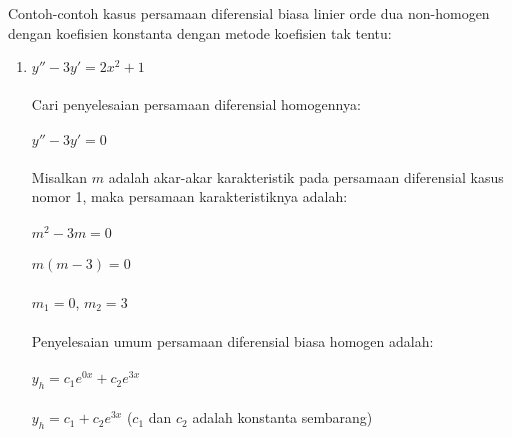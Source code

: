 Contoh-contoh kasus persamaan diferensial biasa linier orde dua non-homogen dengan koefisien konstanta dengan metode koefisien tak tentu:

\begin{enumerate}[1.]

	\item \begin{math} y'' - 3y' = 2x^{2} + 1 \end{math} \\ \\
	Cari penyelesaian persamaan diferensial homogennya: \\ \\
	\begin{math} y'' - 3y' = 0 \end{math} \\ \\
	Misalkan \begin{math} m \end{math} adalah akar-akar karakteristik pada persamaan diferensial kasus nomor 1, maka persamaan karakteristiknya adalah: \\ \\
	\begin{math} m^{2} - 3m = 0 \end{math} \\ \\
	\begin{math} m (m - 3) = 0 \end{math} \\ \\
	\begin{math} m_1 = 0 \end{math}, \begin{math} m_2 = 3 \end{math} \\ \\
	Penyelesaian umum persamaan diferensial biasa homogen adalah: \\ \\
	\begin{math} y_h = c_1 e^{0x} + c_2 e^{3x} \end{math} \\ \\
	\begin{math} y_h = c_1 + c_2 e^{3x} \end{math} (\begin{math} c_1 \end{math} dan \begin{math} c_2 \end{math} adalah konstanta sembarang) \\ \\

\end{enumerate}
